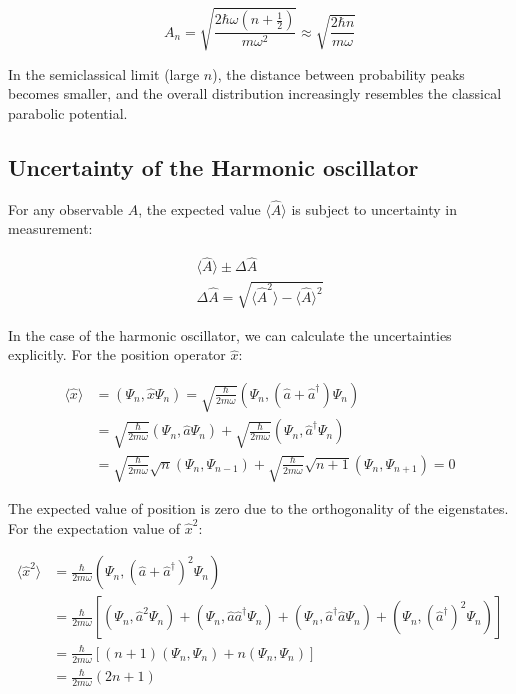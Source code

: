 \documentclass[italian]{HKNdocument}
\begin{document}
\begin{equation}
A_n = \sqrt{\frac{2\hbar\omega(n+\frac{1}{2})}{m\omega^2}} \approx \sqrt{\frac{2\hbar n}{m\omega}}
\end{equation}

In the semiclassical limit (large $n$), the distance between probability peaks becomes smaller, and the overall distribution increasingly resembles the classical parabolic potential.

\subsection{Uncertainty of the Harmonic oscillator}

For any observable $\hat{A}$, the expected value $\langle\hat{A}\rangle$ is subject to uncertainty in measurement:

\begin{gather}
\langle\hat{A}\rangle \pm \Delta\hat{A}  \\
\Delta\hat{A} = \sqrt{\langle\hat{A}^2\rangle - \langle\hat{A}\rangle^2}
\end{gather}


In the case of the harmonic oscillator, we can calculate the uncertainties explicitly. For the position operator $\hat{x}$:

\begin{align}
\langle\hat{x}\rangle &= (\Psi_n, \hat{x}\Psi_n) = \sqrt{\frac{\hbar}{2m\omega}}(\Psi_n, (\hat{a}+\hat{a}^\dagger)\Psi_n) \\
&= \sqrt{\frac{\hbar}{2m\omega}}(\Psi_n, \hat{a}\Psi_n) + \sqrt{\frac{\hbar}{2m\omega}}(\Psi_n, \hat{a}^\dagger\Psi_n) \\
&= \sqrt{\frac{\hbar}{2m\omega}}\sqrt{n}(\Psi_n, \Psi_{n-1}) + \sqrt{\frac{\hbar}{2m\omega}}\sqrt{n+1}(\Psi_n, \Psi_{n+1}) = 0
\end{align}

The expected value of position is zero due to the orthogonality of the eigenstates. For the expectation value of $\hat{x}^2$:

\begin{align}
\langle\hat{x}^2\rangle &= \frac{\hbar}{2m\omega}(\Psi_n, (\hat{a}+\hat{a}^\dagger)^2\Psi_n) \\
&= \frac{\hbar}{2m\omega}[(\Psi_n, \hat{a}^2\Psi_n) + (\Psi_n, \hat{a}\hat{a}^\dagger\Psi_n) + (\Psi_n, \hat{a}^\dagger\hat{a}\Psi_n) + (\Psi_n, (\hat{a}^\dagger)^2\Psi_n)] \\
&= \frac{\hbar}{2m\omega}[(n+1)(\Psi_n, \Psi_n) + n(\Psi_n, \Psi_n)] \\
&= \frac{\hbar}{2m\omega}(2n+1)
\end{align}
\end{document}

